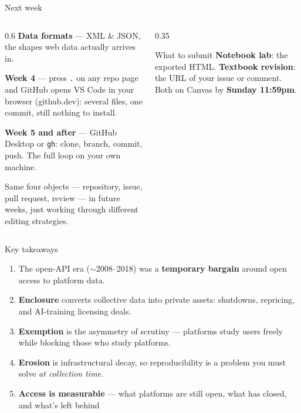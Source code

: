 \documentclass[9pt,aspectratio=169]{beamer}
\begin{document}
\begin{frame}{Next week}
    \begin{columns}[T]
        \begin{column}{0.6\textwidth}
            \textbf{Data formats} --- XML \& JSON, the shapes web data actually arrives in.

            \medskip

            \textbf{Week 4} --- press \texttt{.} on any repo page and GitHub opens VS Code in your browser (github.dev): several files, one commit, still nothing to install.

            \medskip

            \textbf{Week 5 and after} --- GitHub Desktop or \texttt{gh}: clone, branch, commit, push. The full loop on your own machine.

            \medskip

            Same four objects --- repository, issue, pull request, review --- in future weeks, just working through different editing strategies.
        \end{column}
        \begin{column}{0.35\textwidth}
            \begin{alertblock}{What to submit}
                \small \textbf{Notebook lab}: the exported HTML. \textbf{Textbook revision}: the URL of your issue or comment. Both on Canvas by \textbf{Sunday 11:59pm}.
            \end{alertblock}
        \end{column}
    \end{columns}
\end{frame}

\begin{frame}{Key takeaways}
    \begin{enumerate}
        \item The open-API era ($\sim$2008--2018) was a \textbf{temporary bargain} around open access to platform data.
        \item \textbf{Enclosure} converts collective data into private assets: shutdowns, repricing, and AI-training licensing deals.
        \item \textbf{Exemption} is the asymmetry of scrutiny --- platforms study users freely while blocking those who study platforms.
        \item \textbf{Erosion} is infrastructural decay, so reproducibility is a problem you must solve \textit{at collection time}.
        \item \textbf{Access is measurable} --- what platforms are still open, what has closed, and what's left behind
    \end{enumerate}
\end{frame}
\end{document}
